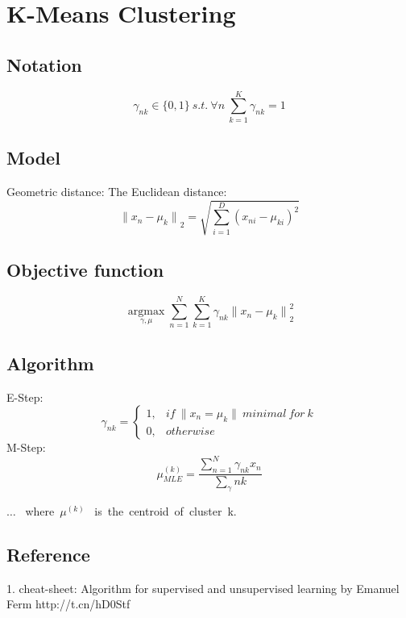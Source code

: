 \chapter{K-Means Clustering}

\section{Notation}

\begin{equation}
\gamma_{nk} \in \{0,1\} \ s.t.\ \forall n\ \sum_{k=1}^K \gamma_{nk}=1
\end{equation}


\section{Model}
Geometric distance: The Euclidean distance:
\begin{equation}
{\|{x_n-\mu_k}\|}_2=\sqrt{\sum_{i=1}^D (x_{ni}-\mu_{ki})^2}
\end{equation}

\section{Objective function}
\begin{equation}
\underset{\gamma,\mu}{\operatorname{argmax}} \sum_{n=1}^N {\sum_{k=1}^K}\gamma_{nk}{{\|{x_n-\mu_k}\|}_2^2}
\end{equation}

\section{Algorithm}
E-Step:
\begin{equation}
\gamma_{nk}=\begin{cases} 1,& if\  \|x_n=\mu_k\| \ minimal\ for  \ k \\ 0, &otherwise \end{cases}
\end{equation}
M-Step:
\begin{equation}
\mu_{MLE}^{(k)}= \frac{\sum_{n=1}^N{\gamma_{nk}x_n}}{\sum_\gamma {nk}}
\end{equation}

$\dotsc$ \ where\ $\mu^{(k)}$ \ is\ the\ centroid\ of\ cluster\ k.

\section{Reference}
1. cheat-sheet: Algorithm for supervised and unsupervised learning by Emanuel Ferm http://t.cn/hD0Stf
